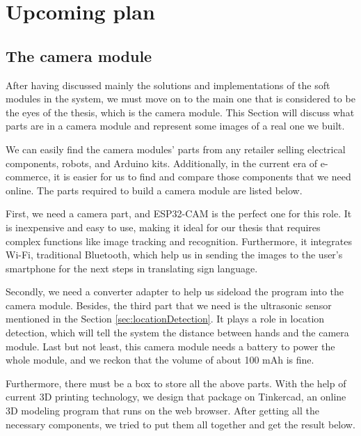 \chapter{Upcoming plan}

\section{The camera module}

After having discussed mainly the solutions and implementations of the soft modules in the system, we must move on to the main one that is considered to be the eyes of the thesis, which is the camera module. This Section will discuss what parts are in a camera module and represent some images of a real one we built.

We can easily find the camera modules' parts from any retailer selling electrical components, robots, and Arduino kits. Additionally, in the current era of e-commerce, it is easier for us to find and compare those components that we need online. The parts required to build a camera module are listed below.

First, we need a camera part, and ESP32-CAM is the perfect one for this role. It is inexpensive and easy to use, making it ideal for our thesis that requires complex functions like image tracking and recognition. Furthermore, it integrates Wi-Fi, traditional Bluetooth, which help us in sending the images to the user's smartphone for the next steps in translating sign language.

Secondly, we need a converter adapter to help us sideload the program into the camera module. Besides, the third part that we need is the ultrasonic sensor mentioned in the Section \ref{sec:locationDetection}. It plays a role in location detection, which will tell the system the distance between hands and the camera module. Last but not least, this camera module needs a battery to power the whole module, and we reckon that the volume of about 100 mAh is fine.

Furthermore, there must be a box to store all the above parts. With the help of current 3D printing technology, we design that package on Tinkercad, an online 3D modeling program that runs on the web browser. After getting all the necessary components, we tried to put them all together and get the result below.

